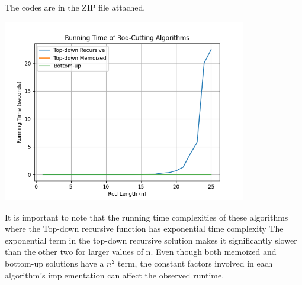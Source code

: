 \documentclass[a4paper]{exam}
\begin{document}
\begin{questions}

  
  \begin{solution}
    The codes are in the ZIP file attached.

    \begin{center}
      \includegraphics[width=0.8\textwidth]{Figure_1.png}
    \end{center}
    It is important to note that the running time complexities of these algorithms where the Top-down recursive function has exponential time complexity
    The exponential term in the top-down recursive solution makes it significantly slower than the other two for larger values of n. Even though both memoized and bottom-up solutions have a $n^2$ term, the constant factors involved in each algorithm's implementation can affect the observed runtime.
  \end{solution}
\end{questions}
\end{document}
